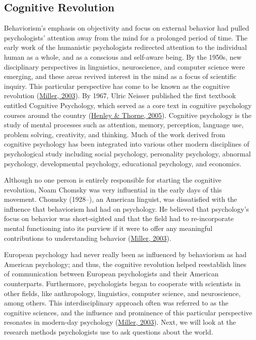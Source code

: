 \documentclass[
]{krantz}
\begin{document}
\hypertarget{cognitive-revolution}{%
\subsection*{Cognitive Revolution}\label{cognitive-revolution}}


Behaviorism's emphasis on objectivity and focus on external behavior had pulled psychologists' attention away from the mind for a prolonged period of time. The early work of the humanistic psychologists redirected attention to the individual human as a whole, and as a conscious and self-aware being. By the 1950s, new disciplinary perspectives in linguistics, neuroscience, and computer science were emerging, and these areas revived interest in the mind as a focus of scientific inquiry. This particular perspective has come to be known as the cognitive revolution (\protect\hyperlink{ref-miller2003}{Miller, 2003}). By 1967, Ulric Neisser published the first textbook entitled Cognitive Psychology, which served as a core text in cognitive psychology courses around the country (\protect\hyperlink{ref-henley2005lost}{Henley \& Thorne, 2005}). Cognitive psychology is the study of mental processes such as attention, memory, perception, language use, problem solving, creativity, and thinking. Much of the work derived from cognitive psychology has been integrated into various other modern disciplines of psychological study including social psychology, personality psychology, abnormal psychology, developmental psychology, educational psychology, and economics.

Although no one person is entirely responsible for starting the cognitive revolution, Noam Chomsky was very influential in the early days of this movement. Chomsky (1928--), an American linguist, was dissatisfied with the influence that behaviorism had had on psychology. He believed that psychology's focus on behavior was short-sighted and that the field had to re-incorporate mental functioning into its purview if it were to offer any meaningful contributions to understanding behavior (\protect\hyperlink{ref-miller2003}{Miller, 2003}).

European psychology had never really been as influenced by behaviorism as had American psychology; and thus, the cognitive revolution helped reestablish lines of communication between European psychologists and their American counterparts. Furthermore, psychologists began to cooperate with scientists in other fields, like anthropology, linguistics, computer science, and neuroscience, among others. This interdisciplinary approach often was referred to as the cognitive sciences, and the influence and prominence of this particular perspective resonates in modern-day psychology (\protect\hyperlink{ref-miller2003}{Miller, 2003}). Next, we will look at the research methods psychologists use to ask questions about the world.
\end{document}
